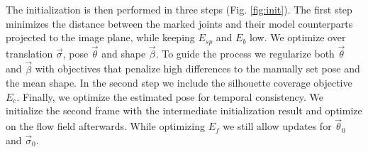 \documentclass[10pt,twocolumn,letterpaper]{article}
\begin{document}
The initialization is then performed in three steps (Fig. \ref{fig:init}). The first step minimizes the distance between the marked joints and their model counterparts projected to the image plane, while keeping $E_{sp}$ and $E_b$ low. We optimize over translation $\vec{\sigma}$, pose $\vec{\theta}$ and shape $\vec{\beta}$. To guide the process we regularize both $\vec{\theta}$ and $\vec{\beta}$ with objectives that penalize high differences to the manually set pose and the mean shape. In the second step we include the silhouette coverage objective $E_c$. Finally, we optimize the estimated pose for temporal consistency. We initialize the second frame with the intermediate initialization result and optimize on the flow field afterwards. While optimizing $E_f$ we still allow updates for $\vec{\theta}_0$ and $\vec{\sigma}_0$.






\end{document}
